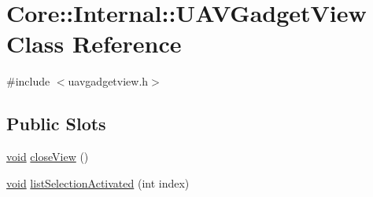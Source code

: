 \hypertarget{class_core_1_1_internal_1_1_u_a_v_gadget_view}{\section{\-Core\-:\-:\-Internal\-:\-:\-U\-A\-V\-Gadget\-View \-Class \-Reference}
\label{class_core_1_1_internal_1_1_u_a_v_gadget_view}
}


{\ttfamily \#include $<$uavgadgetview.\-h$>$}

\subsection*{\-Public \-Slots}
\begin{DoxyCompactItemize}
\item 
\hyperlink{group___u_a_v_objects_plugin_ga444cf2ff3f0ecbe028adce838d373f5c}{void} \hyperlink{group___core_plugin_gaff786c8d73de45a91dd8d696e60ccf7d}{close\-View} ()
\item 
\hyperlink{group___u_a_v_objects_plugin_ga444cf2ff3f0ecbe028adce838d373f5c}{void} \hyperlink{group___core_plugin_gab260059975a562d321095827fa8de699}{list\-Selection\-Activated} (int index)
\end{DoxyCompactItemize}
